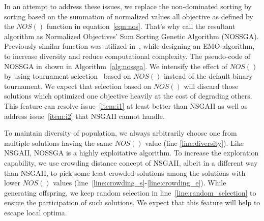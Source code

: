 In an attempt to address these issues, we replace the non-dominated sorting by sorting based on the summation of normalized values all objective as defined by the $NOS()$ function in equation~\ref{eqn:nos}. That's why call the resultant algorithm as Normalized Objectives' Sum Sorting Genetic Algorithm (NOSSGA). Previously similar function was utilized in~\cite{qu2010multi}, while designing an EMO algorithm, to increase diversity and reduce computational complexity. The pseudo-code of NOSSGA in shown in Algorithm~\ref{alg:nossga}. We intensify the effect of $NOS()$ by using tournament selection~\cite{goldberg1991comparative} based on $NOS()$ instead of the default binary tournament. We expect that selection based on $NOS()$ will discard those solutions which optimized one objective heavily at the cost of degrading others. This feature can resolve issue~\ref{item:i1} at least better than NSGAII as well as address issue~\ref{item:i2} that NSGAII cannot handle. 

To maintain diversity of population, we always arbitrarily choose one from multiple solutions having the same $NOS()$ value (line \ref{line:diversity}). Like NSGAII, NOSSGA is a highly exploitative algorithm. To increase the exploration capability, we use crowding distance concept of NSGAII, albeit in a different way than NSGAII, to pick some least crowded solutions among the solutions with lower $NOS()$ values  (line~\ref{line:crowding_s}-\ref{line:crowding_e}). While generating offspring, we keep random selection in line~\ref{line:random_selection} to ensure the participation of such solutions. We expect that this feature will help to escape local optima.



